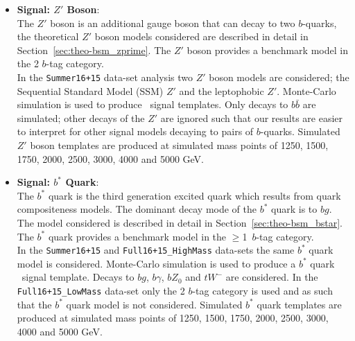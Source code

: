 \begin{itemize}[leftmargin=*]
\item\textbf{Signal: $Z'$ Boson}: \\
  The $Z'$ boson is an additional gauge boson that can decay to two $b$-quarks,
  the theoretical $Z'$ boson models considered are
  described in detail in Section~\ref{sec:theo-bsm_zprime}.
  The $Z'$ boson provides a benchmark model in the 2 $b$-tag category.\\

  In the \verb|Summer16+15| data-set analysis two $Z'$ boson models are considered;
  the Sequential Standard Model (SSM) $Z'$ and the leptophobic $Z'$.
  Monte-Carlo simulation is used to produce \mjj~signal templates.
  Only decays to $b\bar{b}$ are simulated;
  other decays of the  $Z'$  are ignored such that our
  results are easier to interpret for other signal models decaying to pairs of $b$-quarks.
  Simulated $Z'$ boson templates are produced at simulated mass points of
  1250, 1500, 1750, 2000, 2500, 3000, 4000 and 5000 GeV.\\
  

\item\textbf{Signal: $b^*$ Quark}: \\
  The $b^*$ quark is the third generation excited quark which results from
  quark compositeness models.
  The dominant decay mode of the  $b^*$ quark is to $bg$.
  The model considered is
  described in detail in Section~\ref{sec:theo-bsm_bstar}.
  The $b^*$ quark provides a benchmark model in the $\geq$1~$b$-tag category.\\
  
  In the \verb|Summer16+15| and \verb|Full16+15_HighMass|
  data-sets the same $b^*$ quark model is considered.
  Monte-Carlo simulation is used to produce a $b^*$ quark \mjj~signal template.
  Decays to $bg$, $b\gamma$, $bZ_0$ and $tW^{-}$ are considered.
  In the \verb|Full16+15_LowMass| data-set
  only the 2 $b$-tag category is used
  and as such that the $b^*$ quark model is not considered.
  Simulated $b^*$ quark templates are produced at simulated mass points of
  1250, 1500, 1750, 2000, 2500, 3000, 4000 and 5000 GeV.
\end{itemize}

